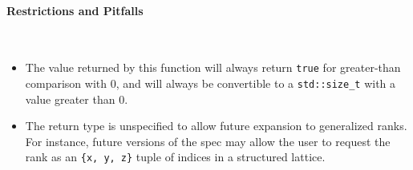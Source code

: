 \paragraph{Restrictions and Pitfalls}\mbox{} \\
\begin{itemize}
  \item The value returned by this function will always return \texttt{true}
  for greater-than comparison with 0, and will always be convertible to a
  \texttt{std::size\_t} with a value greater than 0.
  \item The return type is unspecified to allow future expansion to generalized
  ranks.  For instance, future versions of the spec may allow the user to
  request the rank as an \texttt{\{x, y, z\}} tuple of indices in a structured
  lattice.
\end{itemize}

